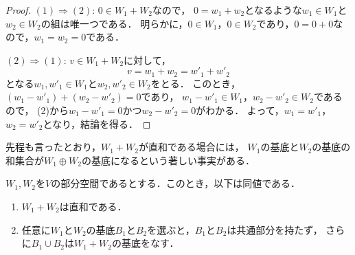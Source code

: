 \begin{proof}
  $(1)\Rightarrow (2)$: $0 \in W_1 + W_2$なので，
  $0=w_1 + w_2$となるような$w_1 \in W_1$と$w_2 \in W_2$の組は唯一つである．
  明らかに，$0 \in W_1$，$0 \in W_2$であり，$0 = 0 + 0$なので，$w_1 = w_2 = 0$である．

  $(2)\Rightarrow (1)$: $v \in W_1 + W_2$に対して，
  \[
    v = w_1 + w_2 = w'_1 + w'_2
  \]
  となる$w_1,w'_1 \in W_1$と$w_2,w'_2 \in W_2$をとる．
  このとき，$(w_1 - w'_1) + (w_2 - w'_2) = 0$であり，
  $w_1 - w'_1 \in W_1$，$w_2 - w'_2 \in W_2$であるので，
  (2)から$w_1 - w'_1 = 0$かつ$w_2 - w'_2 = 0$がわかる．
  よって，$w_1 = w'_1$，$w_2 = w'_2$となり，結論を得る．
\end{proof}
先程も言ったとおり，$W_1 + W_2$が直和である場合には，
$W_1$の基底と$W_2$の基底の和集合が$W_1 \oplus W_2$の基底になるという著しい事実がある．
\begin{prop}
  $W_1,W_2$を$V$の部分空間であるとする．このとき，以下は同値である．
  \begin{enumerate}
    \item $W_1 + W_2$は直和である．
    \item 任意に$W_1$と$W_2$の基底$B_1$と$B_2$を選ぶと，$B_1$と$B_2$は共通部分を持たず，
        さらに$B_1 \cup B_2$は$W_1 + W_2$の基底をなす．
  \end{enumerate}
\end{prop}
